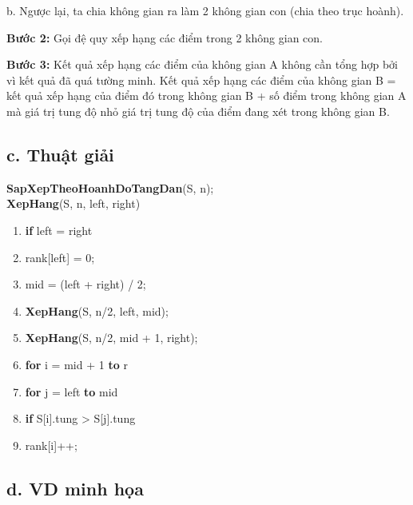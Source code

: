 \documentclass[12pt, a4paper, fleqn]{article}
\begin{document}
b. Ngược lại, ta chia không gian ra làm 2 không gian con (chia theo trục hoành).


\textbf{Bước 2:}
Gọi đệ quy xếp hạng các điểm trong 2 không gian con.

\textbf{Bước 3:}
Kết quả xếp hạng các điểm của không gian A không cần tổng hợp bởi vì kết quả đã quá tường minh.
Kết quả xếp hạng các điểm của không gian B = kết quả xếp hạng của điểm đó trong không gian B + số điểm trong không gian A mà giá trị tung độ nhỏ giá trị tung độ của điểm đang xét trong không gian B.

\subsection*{c. Thuật giải}

{  \selectfont
	\textbf{SapXepTheoHoanhDoTangDan}(S, n);\\
	\textbf{XepHang}(S, n, left, right)
	\begin{enumerate}
		\item \textbf{if} left = right
		\item \qquad rank[left] = 0;
		\item mid = (left + right) / 2;
		\item \textbf{XepHang}(S, n/2, left, mid);
		\item \textbf{XepHang}(S, n/2, mid + 1, right);
		\item \textbf{for} i = mid + 1 \textbf{to} r
		\item \qquad \textbf{for} j = left \textbf{to} mid
		\item \qquad \qquad \textbf{if} S[i].tung > S[j].tung
		\item \qquad \qquad \qquad rank[i]++;
	\end{enumerate}
}

\subsection*{d. VD minh họa}
\end{document}
